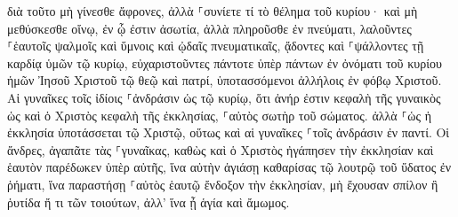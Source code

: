 \documentclass{openreader}
\begin{document}
διὰ τοῦτο μὴ γίνεσθε ἄφρονες, ἀλλὰ ⸀συνίετε τί τὸ θέλημα τοῦ κυρίου· 
καὶ μὴ μεθύσκεσθε οἴνῳ, ἐν ᾧ ἐστιν ἀσωτία, ἀλλὰ πληροῦσθε ἐν πνεύματι, 
λαλοῦντες ⸀ἑαυτοῖς ψαλμοῖς καὶ ὕμνοις καὶ ᾠδαῖς πνευματικαῖς, ᾄδοντες καὶ ⸀ψάλλοντες τῇ καρδίᾳ ὑμῶν τῷ κυρίῳ, 
εὐχαριστοῦντες πάντοτε ὑπὲρ πάντων ἐν ὀνόματι τοῦ κυρίου ἡμῶν Ἰησοῦ Χριστοῦ τῷ θεῷ καὶ πατρί, 
ὑποτασσόμενοι ἀλλήλοις ἐν φόβῳ Χριστοῦ. 
Αἱ γυναῖκες τοῖς ἰδίοις ⸀ἀνδράσιν ὡς τῷ κυρίῳ, 
ὅτι ἀνήρ ἐστιν κεφαλὴ τῆς γυναικὸς ὡς καὶ ὁ Χριστὸς κεφαλὴ τῆς ἐκκλησίας, ⸀αὐτὸς σωτὴρ τοῦ σώματος. 
ἀλλὰ ⸀ὡς ἡ ἐκκλησία ὑποτάσσεται τῷ Χριστῷ, οὕτως καὶ αἱ γυναῖκες ⸀τοῖς ἀνδράσιν ἐν παντί. 
Οἱ ἄνδρες, ἀγαπᾶτε τὰς ⸀γυναῖκας, καθὼς καὶ ὁ Χριστὸς ἠγάπησεν τὴν ἐκκλησίαν καὶ ἑαυτὸν παρέδωκεν ὑπὲρ αὐτῆς, 
ἵνα αὐτὴν ἁγιάσῃ καθαρίσας τῷ λουτρῷ τοῦ ὕδατος ἐν ῥήματι, 
ἵνα παραστήσῃ ⸀αὐτὸς ἑαυτῷ ἔνδοξον τὴν ἐκκλησίαν, μὴ ἔχουσαν σπίλον ἢ ῥυτίδα ἤ τι τῶν τοιούτων, ἀλλ’ ἵνα ᾖ ἁγία καὶ ἄμωμος. 
\end{document}

